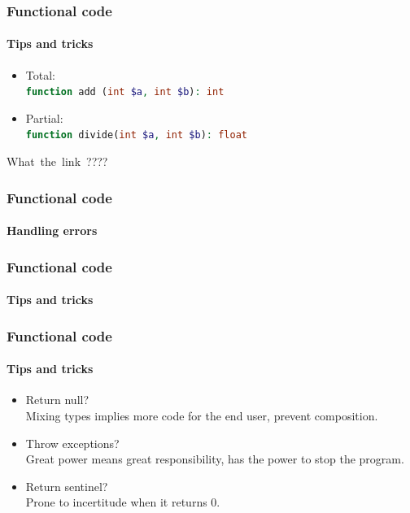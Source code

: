 \begin{frame}
    \frametitle{Functional code}
    \framesubtitle{Tips and tricks}

    \begin{itemize}
        \item Total:\pause
        \\\lstinline[language=PHP]!function add (int $a, int $b): int!
        \pause
        \item Partial:\pause
        \\\lstinline[language=PHP]!function divide(int $a, int $b): float!
    \end{itemize}
\end{frame}

\begin{frame}
    What\pause\ the\pause\ link\pause\ ????
\end{frame}

\begin{frame}
    \frametitle{Functional code}
    \framesubtitle{Handling errors}

    
    \pause
    
\end{frame}

\begin{frame}
    \frametitle{Functional code}
    \framesubtitle{Tips and tricks}

    
    \pause
    
    \pause
    
\end{frame}

\begin{frame}
    \frametitle{Functional code}
    \framesubtitle{Tips and tricks}

    \begin{itemize}
        \item Return null?\pause
            \\\textcolor{ecgrey!50}{Mixing types implies more code for the end
            user, prevent composition.}
        \item Throw exceptions?\pause
            \\\textcolor{ecgrey!50}{Great power means great responsibility, has
            the power to stop the program.}
        \item Return sentinel?\pause
            \\\textcolor{ecgrey!50}{Prone to incertitude when it returns 0.}
    \end{itemize}
\end{frame}

